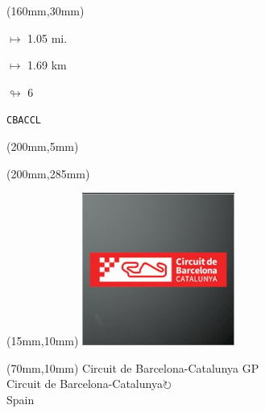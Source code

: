 \begin{textblock*}{40mm}(160mm,30mm)%
\Large
\par$\mapsto$ 1.05 mi.
\par$\mapsto$ 1.69 km
\par$\looparrowright$ 6
\par\hfill\tiny\tt CBACCL\\
\end{textblock*}
\begin{textblock*}{20mm}(200mm,5mm)%
\fbox{\thepage}
\label{CBACCL}
\end{textblock*}
\begin{textblock*}{20mm}(200mm,285mm)%
\fbox{\thepage}
\end{textblock*}

\null\newpage
\begin{textblock*}{50mm}(15mm,10mm)%
\includegraphics[width=50mm]{LG/2015-05-20_00078.png}
\end{textblock*}
\begin{textblock*}{130mm}(70mm,10mm)%
{\fontsize{20}{20}\selectfont Circuit de Barcelona-Catalunya GP\\}
{\fontsize{16}{16}\selectfont Circuit de Barcelona-Catalunya\hfill \Large$\circlearrowright$\\}
{\fontsize{12}{12}\selectfont Spain\\}
\end{textblock*}
